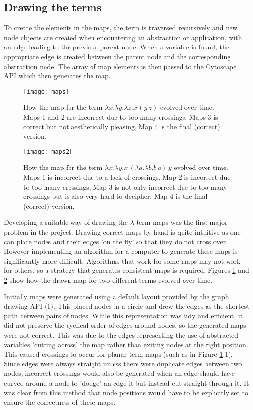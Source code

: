 \documentclass[11pt]{article}
\begin{document}
\subsection{Drawing the terms}

To create the elements in the maps, the term is traversed recursively and new node objects are created when encountering an abstraction or application, with an edge leading to the previous parent node. When a variable is found, the appropriate edge is created between the parent node and the corresponding abstraction node. The array of map elements is then passed to the Cytoscape API which then generates the map.

\begin{figure}
    \centering
    \texttt{[image: maps]}
    \caption{How the map for the term $\lambda x. \lambda y. \lambda z. x \, (y \, z)$ evolved over time. Maps 1 and 2 are incorrect due to too many crossings, Maps 3 is correct but not aesthetically pleasing, Map 4 is the final (correct) version.}
    \label{fig:drawn_maps}
\end{figure}

\begin{figure}
    \centering
    \texttt{[image: maps2]}
    \caption{How the map for the term $\lambda x. \lambda y. x \, (\lambda a. \lambda b. b \, a) \, y$ evolved over time. Maps 1 is incorrect due to a lack of crossings, Map 2 is incorrect due to too many crossings, Map 3 is not only incorrect due to too many crossings but is also very hard to decipher, Map 4 is the final (correct) version.}
    \label{fig:drawn_maps2}
\end{figure}

Developing a suitable way of drawing the $\lambda$-term maps was the first major problem in the project. Drawing correct maps by hand is quite intuitive as one can place nodes and their edges 'on the fly' so that they do not cross over. However implementing an algorithm for a computer to generate these maps is significantly more difficult. Algorithms that work for some maps may not work for others, so a strategy that generates consistent maps is required. Figures \ref{fig:drawn_maps} and \ref{fig:drawn_maps2} show how the drawn map for two different terms evolved over time.

Initially maps were generated using a default layout provided by the graph drawing API (1). This placed nodes in a circle and drew the edges as the shortest path between pairs of nodes. While this representation was tidy and efficient, it did not preserve the cyclical order of edges around nodes, so the generated maps were not correct. This was due to the edges representing the use of abstracted variables 'cutting across' the map rather than exiting nodes at the right position. This caused crossings to occur for planar term maps (such as in Figure \ref{fig:drawn_maps}.1). Since edges were always straight unless there were duplicate edges between two nodes, incorrect crossings would also be generated when an edge should have curved around a node to 'dodge' an edge it but instead cut straight through it. It was clear from this method that node positions would have to be explicitly set to ensure the correctness of these maps.
\end{document}
